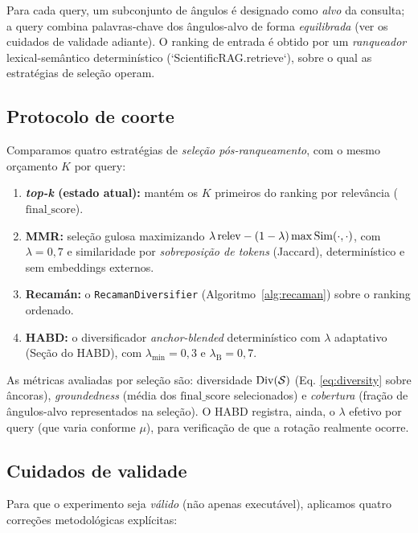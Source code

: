 Para cada query, um subconjunto de ângulos é designado como \emph{alvo} da
consulta; a query combina palavras-chave dos ângulos-alvo de forma \emph{equilibrada}
(ver os cuidados de validade adiante). O ranking de entrada é obtido por um
\emph{ranqueador} lexical-semântico determinístico (`ScientificRAG.retrieve`),
sobre o qual as estratégias de seleção operam.

\subsection{Protocolo de coorte}

Comparamos quatro estratégias de \emph{seleção pós-ranqueamento}, com o mesmo
orçamento $K$ por query:
\begin{enumerate}
  \item \textbf{\emph{top-k} (estado atual):} mantém os $K$ primeiros do ranking
        por relevância ($\mathrm{final\_score}$).
  \item \textbf{MMR:} seleção gulosa maximizando
        $\lambda\,\mathrm{relev} - (1-\lambda)\max \mathrm{Sim}(\cdot,\cdot)$, com
        $\lambda=0{,}7$ e similaridade por \emph{sobreposição de tokens}
        (Jaccard), determinístico e sem embeddings externos.
  \item \textbf{Recamán:} o \texttt{RecamanDiversifier} (Algoritmo~\ref{alg:recaman})
        sobre o ranking ordenado.
  \item \textbf{HABD:} o diversificador \emph{anchor-blended} determinístico com
        $\lambda$ adaptativo (Seção do HABD), com $\lambda_{\min}=0{,}3$ e
        $\lambda_{\mathrm B}=0{,}7$.
\end{enumerate}

As métricas avaliadas por seleção são: diversidade $\mathrm{Div}(\mathcal{S})$ (Eq.
\ref{eq:diversity} sobre âncoras), \emph{groundedness} (média dos
$\mathrm{final\_score}$ selecionados) e \emph{cobertura} (fração de ângulos-alvo
representados na seleção). O HABD registra, ainda, o $\lambda$ efetivo por query
(que varia conforme $\mu$), para verificação de que a rotação realmente ocorre.

\subsection{Cuidados de validade}

Para que o experimento seja \emph{válido} (não apenas executável), aplicamos
quatro correções metodológicas explícitas:

